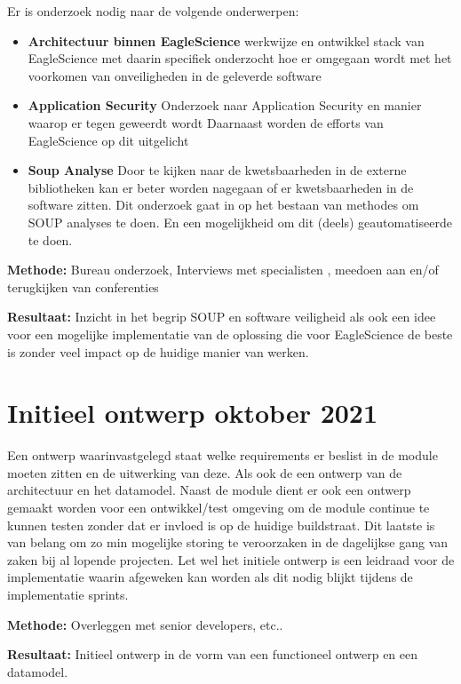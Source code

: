Er is onderzoek nodig naar de volgende onderwerpen:
\begin{itemize}
    \item \textbf{Architectuur binnen EagleScience} werkwijze en ontwikkel stack van EagleScience met daarin specifiek onderzocht hoe er omgegaan wordt met het voorkomen van onveiligheden in de geleverde software
    \item \textbf{Application Security} Onderzoek naar Application Security en manier waarop er tegen geweerdt wordt Daarnaast worden de efforts van EagleScience op dit uitgelicht
    \item \textbf{Soup Analyse} Door te kijken naar de kwetsbaarheden in de externe bibliotheken kan er beter worden nagegaan of er kwetsbaarheden in de software zitten. Dit onderzoek gaat in op het bestaan van methodes om SOUP analyses te doen. En een mogelijkheid om dit (deels) geautomatiseerde te doen.
\end{itemize}

\textbf{Methode:} Bureau onderzoek, Interviews met specialisten , meedoen aan en/of terugkijken van conferenties

\textbf{Resultaat:} Inzicht in het begrip SOUP en software veiligheid als ook een idee voor een mogelijke implementatie van de oplossing die voor EagleScience de beste is zonder veel impact op de huidige manier van werken.

\section{Initieel ontwerp \textbf{oktober 2021 }}\label{sec:initieel-ontwerp}
Een ontwerp waarinvastgelegd staat welke requirements er beslist in de module moeten zitten en de uitwerking van deze. Als ook de een ontwerp van de architectuur en het datamodel. Naast de module dient er ook een ontwerp gemaakt worden voor een ontwikkel/test omgeving om de module continue te kunnen testen zonder dat er invloed is op de huidige buildstraat. Dit laatste is van belang om zo min mogelijke storing te veroorzaken in de dagelijkse gang van zaken bij al lopende projecten. Let wel het initiele ontwerp is een leidraad voor de implementatie waarin afgeweken kan worden als dit nodig blijkt tijdens de implementatie sprints.

\textbf{Methode:} Overleggen met senior developers, etc..

\textbf{Resultaat:} Initieel ontwerp in de vorm van een functioneel ontwerp en een datamodel.

